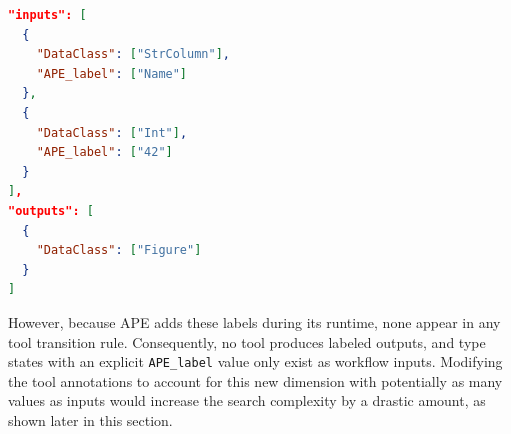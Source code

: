 \begin{lstlisting}[language=json, caption=Example of APE IO Configuration., label=code:APE_label_IO]
"inputs": [
  {
    "DataClass": ["StrColumn"],
    "APE_label": ["Name"]
  },
  {
    "DataClass": ["Int"],
    "APE_label": ["42"]
  }
],
"outputs": [
  {
    "DataClass": ["Figure"]
  }
]
\end{lstlisting}

However, because APE adds these labels during its runtime, none appear in any tool transition rule. Consequently, no tool produces labeled outputs, and type states with an explicit \verb|APE_label| value only exist as workflow inputs. Modifying the tool annotations to account for this new dimension with potentially as many values as inputs would increase the search complexity by a drastic amount, as shown later in this section.

